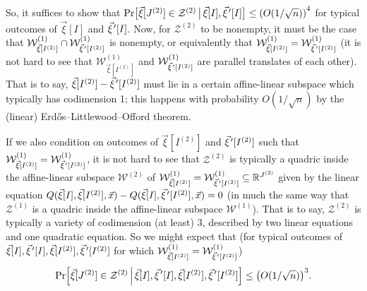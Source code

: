 \documentclass[english]{article}
\theoremstyle{remark}
\numberwithin{equation}{section}
\numberwithin{figure}{section}
\newcommand{\pvec}[1]{\vec{#1}\mkern2mu\vphantom{#1}'}
\newcommand{\su}{\subseteq}
\newcommand{\RR}{\mathbb{R}}
\newcommand{\mc}{\mathcal}
\let\originalleft\left
\let\originalright\right
\renewcommand{\left}{\mathopen{}\mathclose\bgroup\originalleft}
\renewcommand{\right}{\aftergroup\egroup\originalright}
\begin{document}
So, it suffices to show that $\Pr\bigl[\vec \xi[J^{(2)}]\in \mc Z^{(2)}\,\big|\,\vec \xi[I],\pvec \xi[I]\bigr]\le \left(O(1/\sqrt n)\right)^4$ for typical outcomes of $\vec \xi[I]$ and $\pvec \xi[I]$.
Now, for $\mathcal{Z}^{(2)}$ to be nonempty, it must be the case that $\mathcal{W}^{(1)}_{\vec \xi[I^{(2)}]}\cap\mathcal{W}^{(1)}_{\pvec\xi[I^{(2)}]}$ is nonempty, or equivalently that $\mathcal{W}^{(1)}_{\vec \xi[I^{(2)}]}=\mathcal{W}^{(1)}_{\pvec \xi[I^{(2)}]}$ (it is not hard to see that $\mathcal{W}^{(1)}_{\vec \xi[I^{(2)}]}$ and $\mathcal{W}^{(1)}_{\pvec \xi[I^{(2)}]}$ are parallel translates of each other).
That is to say, $\vec \xi[I^{(2)}]-\pvec{\xi}[I^{(2)}]$ must lie in a certain affine-linear subspace which typically has codimension 1; this happens with probability $O(1/\sqrt n)$ by the (linear) Erd\H os--Littlewood--Offord theorem.

If we also condition on outcomes of $\vec \xi[I^{(2)}]$ and $\pvec{\xi}[I^{(2)}]$ such that $\mathcal{W}^{(1)}_{\vec \xi[I^{(2)}]}=\mathcal{W}^{(1)}_{\pvec \xi[I^{(2)}]}$, it is not hard to see that $\mc Z^{(2)}$ is typically a quadric inside the affine-linear subspace $\mathcal W^{(2)}$ of $\mathcal{W}^{(1)}_{\vec \xi[I^{(2)}]}=\mathcal{W}^{(1)}_{\pvec \xi[I^{(2)}]}\su \RR^{J^{(2)}}$ given by the linear equation $Q(\vec \xi[I],\vec \xi[I^{(2)}],\vec x)-Q(\vec \xi[I],\pvec \xi[I^{(2)}],\vec x)=0$ (in much the same way that $\mc Z^{(1)}$ is a quadric inside the affine-linear subspace $\mc W^{(1)}$). That is to say, $\mc Z^{(2)}$ is typically a variety of codimension (at least) 3, described by two linear equations and one quadratic equation. So we might expect that (for typical outcomes of $\vec \xi[I],\pvec{\xi}[I],\vec \xi[I^{(2)}],\pvec{\xi}[I^{(2)}]$ for which $\mathcal{W}^{(1)}_{\vec \xi[I^{(2)}]}=\mathcal{W}^{(1)}_{\pvec \xi[I^{(2)}]}$)
\begin{equation}\Pr\Bigl[\vec \xi[J^{(2)}]\in\mathcal{Z}^{(2)}\,\Big|\,\vec \xi[I],\pvec{\xi}[I],\vec \xi[I^{(2)}],\pvec{\xi}[I^{(2)}]\Bigr]\le\left(O(1/\sqrt{n})\right)^{3}.\label{eq:conditional-hope}\end{equation}
\end{document}
